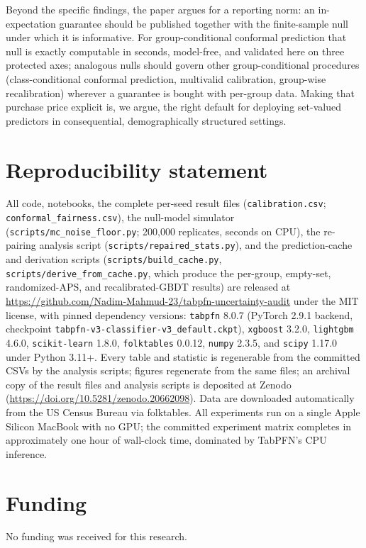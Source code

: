 \documentclass[review,12pt]{elsarticle}
\begin{document}
Beyond the specific findings, the paper argues for a reporting norm: an in-expectation guarantee should be published together with the finite-sample null under which it is informative. For group-conditional conformal prediction that null is exactly computable in seconds, model-free, and validated here on three protected axes; analogous nulls should govern other group-conditional procedures (class-conditional conformal prediction, multivalid calibration, group-wise recalibration) wherever a guarantee is bought with per-group data. Making that purchase price explicit is, we argue, the right default for deploying set-valued predictors in consequential, demographically structured settings.

\section*{Reproducibility statement}
All code, notebooks, the complete per-seed result files (\texttt{calibration.csv}; \texttt{conformal\_fairness.csv}), the null-model simulator (\texttt{scripts/mc\_noise\_floor.py}; 200{,}000 replicates, seconds on CPU), the re-pairing analysis script (\texttt{scripts/repaired\_stats.py}), and the prediction-cache and derivation scripts (\texttt{scripts/build\_cache.py}, \texttt{scripts/derive\_from\_cache.py}, which produce the per-group, empty-set, randomized-APS, and recalibrated-GBDT results) are released at \url{https://github.com/Nadim-Mahmud-23/tabpfn-uncertainty-audit} under the MIT license, with pinned dependency versions: \texttt{tabpfn} 8.0.7 (PyTorch 2.9.1 backend, checkpoint \texttt{tabpfn-v3-classifier-v3\_default.ckpt}), \texttt{xgboost} 3.2.0, \texttt{lightgbm} 4.6.0, \texttt{scikit-learn} 1.8.0, \texttt{folktables} 0.0.12, \texttt{numpy} 2.3.5, and \texttt{scipy} 1.17.0 under Python 3.11+. Every table and statistic is regenerable from the committed CSVs by the analysis scripts; figures regenerate from the same files; an archival copy of the result files and analysis scripts is deposited at Zenodo (\url{https://doi.org/10.5281/zenodo.20662098}). Data are downloaded automatically from the US Census Bureau via folktables. All experiments run on a single Apple Silicon MacBook with no GPU; the committed experiment matrix completes in approximately one hour of wall-clock time, dominated by TabPFN's CPU inference.

\section*{Funding}
No funding was received for this research.
\end{document}
